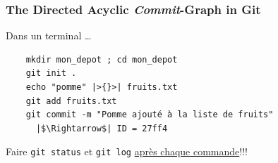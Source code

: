 \documentclass[table,tikz,12pt,svgnames]{beamer}
\begin{document}
\begin{frame}[fragile]
\frametitle{The Directed Acyclic \textit{Commit}-Graph in Git}
 	\begin{figure}
	\end{figure}

	\begin{block}{Dans un terminal \ldots}
	\vspace{-0.2cm}		
	\begin{verbatim}
	mkdir mon_depot ; cd mon_depot
	git init .
	echo "pomme" |>{}>| fruits.txt
	git add fruits.txt
	git commit -m "Pomme ajouté à la liste de fruits"
	  |$\Rightarrow$| ID = 27ff4
	\end{verbatim}
	\end{block}
	Faire \texttt{git status} et \texttt{git log} \underline{après chaque commande}!!!
\end{frame}
\end{document}
